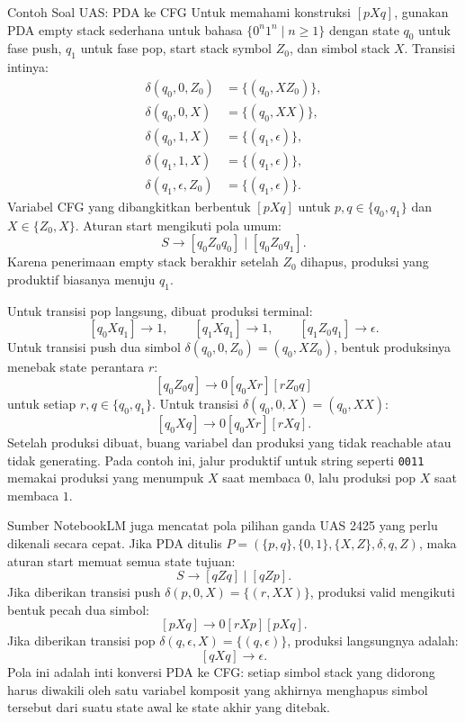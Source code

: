 \begin{cmt}{Contoh Soal UAS: PDA ke CFG}{}
Untuk memahami konstruksi $[pXq]$, gunakan PDA empty stack sederhana untuk bahasa $\{0^n1^n\mid n\geq 1\}$ dengan state $q_0$ untuk fase push, $q_1$ untuk fase pop, start stack symbol $Z_0$, dan simbol stack $X$.
Transisi intinya:
\[
\begin{aligned}
    \delta(q_0,0,Z_0) &= \{(q_0,XZ_0)\},\\
    \delta(q_0,0,X) &= \{(q_0,XX)\},\\
    \delta(q_0,1,X) &= \{(q_1,\epsilon)\},\\
    \delta(q_1,1,X) &= \{(q_1,\epsilon)\},\\
    \delta(q_1,\epsilon,Z_0) &= \{(q_1,\epsilon)\}.
\end{aligned}
\]
Variabel CFG yang dibangkitkan berbentuk $[pXq]$ untuk $p,q\in\{q_0,q_1\}$ dan $X\in\{Z_0,X\}$. Aturan start mengikuti pola umum:
\[
    S\rightarrow [q_0Z_0q_0]\mid [q_0Z_0q_1].
\]
Karena penerimaan empty stack berakhir setelah $Z_0$ dihapus, produksi yang produktif biasanya menuju $q_1$.

Untuk transisi pop langsung, dibuat produksi terminal:
\[
    [q_0Xq_1]\rightarrow 1,\qquad
    [q_1Xq_1]\rightarrow 1,\qquad
    [q_1Z_0q_1]\rightarrow \epsilon.
\]
Untuk transisi push dua simbol $\delta(q_0,0,Z_0)=(q_0,XZ_0)$, bentuk produksinya menebak state perantara $r$:
\[
    [q_0Z_0q]\rightarrow 0[q_0Xr][rZ_0q]
\]
untuk setiap $r,q\in\{q_0,q_1\}$. Untuk transisi $\delta(q_0,0,X)=(q_0,XX)$:
\[
    [q_0Xq]\rightarrow 0[q_0Xr][rXq].
\]
Setelah produksi dibuat, buang variabel dan produksi yang tidak reachable atau tidak generating. Pada contoh ini, jalur produktif untuk string seperti \texttt{0011} memakai produksi yang menumpuk $X$ saat membaca $0$, lalu produksi pop $X$ saat membaca $1$.

Sumber NotebookLM juga mencatat pola pilihan ganda UAS 2425 yang perlu dikenali secara cepat. Jika PDA ditulis $P=(\{p,q\},\{0,1\},\{X,Z\},\delta,q,Z)$, maka aturan start memuat semua state tujuan:
\[
    S\rightarrow [qZq]\mid [qZp].
\]
Jika diberikan transisi push $\delta(p,0,X)=\{(r,XX)\}$, produksi valid mengikuti bentuk pecah dua simbol:
\[
    [pXq]\rightarrow 0[rXp][pXq].
\]
Jika diberikan transisi pop $\delta(q,\epsilon,X)=\{(q,\epsilon)\}$, produksi langsungnya adalah:
\[
    [qXq]\rightarrow \epsilon.
\]
Pola ini adalah inti konversi PDA ke CFG: setiap simbol stack yang didorong harus diwakili oleh satu variabel komposit yang akhirnya menghapus simbol tersebut dari suatu state awal ke state akhir yang ditebak.
\end{cmt}

